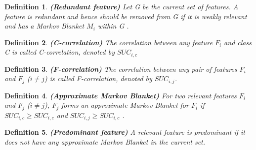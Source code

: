 \documentclass[a4paper,fleqn]{report}
\newtheorem{definition}{Definition}
\begin{document}
\begin{definition}{\bf (Redundant feature)} Let G be the current set of features. A feature is redundant and
hence should be removed from G if it is weakly relevant and has a Markov Blanket $M_i$ within G .
\end{definition}
\begin{definition}{\bf (C-correlation)} The correlation between any feature $F_i$ and class C is called C-correlation,
denoted by $SUC_{i,c}$ \end{definition}
\begin{definition}{\bf (F-correlation)} The correlation between any pair of features $F_i$ and $F_j$ ($i \neq j$) is called
F-correlation, denoted by $SUC_{i,j}$.
\end{definition}
\begin{definition}{\bf (Approximate Markov Blanket)} For two relevant features $F_i$ and $F_j$ ($i \neq j$), $F_j$ forms
an approximate Markov Blanket for $F_i$ if $ SUC_{i,c} \geq SUC_{i,c}$ and $ SUC_{i,j} \geq SUC_{i,c}$ .\end{definition}
\begin{definition}{\bf (Predominant feature)} A relevant feature is predominant if it does not have any
approximate Markov Blanket in the current set.\end{definition}
%
\end{document}
